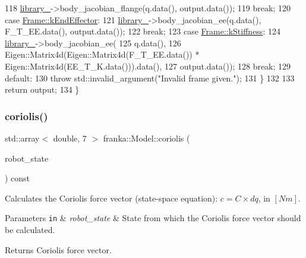 \begin{DoxyCode}
118       \hyperlink{classfranka_1_1Model_a966abbe74240654b093b4d18476ab09b}{library\_}->body\_jacobian\_flange(q.data(), output.data());
119       \textcolor{keywordflow}{break};
120     \textcolor{keywordflow}{case} \hyperlink{namespacefranka_a00b729ddce916481d3f0d10febec4f5ba3617dcc7555dbca3c3e86e7535914fdf}{Frame::kEndEffector}:
121       \hyperlink{classfranka_1_1Model_a966abbe74240654b093b4d18476ab09b}{library\_}->body\_jacobian\_ee(q.data(), F\_T\_EE.data(), output.data());
122       \textcolor{keywordflow}{break};
123     \textcolor{keywordflow}{case} \hyperlink{namespacefranka_a00b729ddce916481d3f0d10febec4f5ba4aa2dd9baea7adf953d69fcea698348f}{Frame::kStiffness}:
124       \hyperlink{classfranka_1_1Model_a966abbe74240654b093b4d18476ab09b}{library\_}->body\_jacobian\_ee(
125           q.data(),
126           Eigen::Matrix4d(Eigen::Matrix4d(F\_T\_EE.data()) * Eigen::Matrix4d(EE\_T\_K.data())).data(),
127           output.data());
128       \textcolor{keywordflow}{break};
129     \textcolor{keywordflow}{default}:
130       \textcolor{keywordflow}{throw} std::invalid\_argument(\textcolor{stringliteral}{"Invalid frame given."});
131   \}
132 
133   \textcolor{keywordflow}{return} output;
134 \}
\end{DoxyCode}
\mbox{\label{classfranka_1_1Model_a9be45a91c3288088dd222f2e55870aa8}} 
\subsubsection{\texorpdfstring{coriolis()}{coriolis()}\hspace{0.1cm}{\footnotesize\ttfamily [1/2]}}
{\footnotesize\ttfamily std\+::array$<$ double, 7 $>$ franka\+::\+Model\+::coriolis (\begin{DoxyParamCaption}\item[{const \hyperlink{structfranka_1_1RobotState}{franka\+::\+Robot\+State} \&}]{robot\+\_\+state }\end{DoxyParamCaption}) const\hspace{0.3cm}{\ttfamily [noexcept]}}

Calculates the Coriolis force vector (state-\/space equation)\+: $ c= C \times dq$, in $[Nm]$.


\begin{DoxyParams}[1]{Parameters}
\mbox{\tt in}  & {\em robot\+\_\+state} & State from which the Coriolis force vector should be calculated.\\
\hline
\end{DoxyParams}
\begin{DoxyReturn}{Returns}
Coriolis force vector. 
\end{DoxyReturn}


